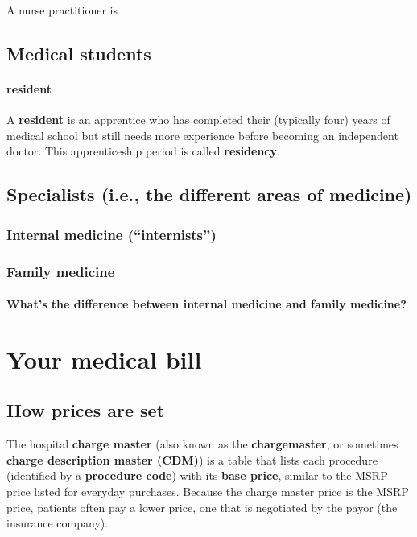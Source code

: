 \documentclass{article}
\begin{document}
A nurse practitioner is

\subsection{Medical students}

\paragraph{resident} A {\bf resident} is an apprentice who has completed their (typically four) years of medical school but still needs more experience before becoming an independent doctor. This apprenticeship period is called {\bf residency}.

\subsection{Specialists (i.e., the different areas of medicine)}

\subsubsection{Internal medicine (``internists'')}

\subsubsection{Family medicine} \cite{what-is-family-medicine}

\begin{tcolorbox}[colframe=Melon, colback=Melon!30]
\paragraph{What's the difference between internal medicine and family medicine?} \cite{diff-bt-internal-family}
\end{tcolorbox}

\section{Your medical bill}

\subsection{How prices are set}

The hospital {\bf charge master} (also known as the {\bf chargemaster}, or sometimes {\bf charge description master (CDM)}) is a table that lists each procedure (identified by a {\bf procedure code}) with its {\bf base price}, similar to the MSRP price listed for everyday purchases. Because the charge master price is the MSRP price, patients often pay a lower price, one that is negotiated by the payor (the insurance company).
\end{document}
